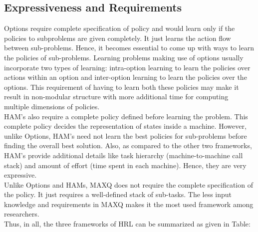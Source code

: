 \subsection{Expressiveness and Requirements}
Options require complete specification of policy and would learn only if the policies to subproblems are given completely. It just learns the action flow between sub-problems. Hence, it becomes essential to come up with ways to learn the policies of sub-problems. Learning problems making use of options usually incorporate two types of learning: intra-option learning to learn the policies over actions within an option and inter-option learning to learn the policies over the options. This requirement of having to learn both these policies may make it result in non-modular structure with more additional time for computing multiple dimensions of policies. \\

HAM’s also require a complete policy defined before learning the problem. This complete policy decides the representation of states inside a machine. However, unlike Options, HAM’s need not learn the best policies for sub-problems before finding the overall best solution. Also, as compared to the other two frameworks, HAM’s provide additional details like task hierarchy (machine-to-machine call stack) and amount of effort (time spent in each machine). Hence, they are very expressive. \\

Unlike Options and HAMs, MAXQ does not require the complete specification of the policy. It just requires a well-defined stack of sub-tasks. The less input knowledge and requirements in MAXQ makes it the most used framework among researchers. \\

Thus, in all, the three frameworks of HRL can be summarized as given in Table:

